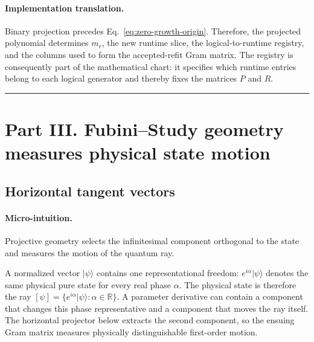 \documentclass[10pt,twocolumn]{article}
\newcommand{\ket}[1]{\lvert #1\rangle}
\newcommand{\R}{\mathbb R}
\newcommand{\conceptbreak}{%
  \par\medskip\noindent
  {\color{black!30}\rule{\columnwidth}{0.35pt}}%
  \par\medskip}
\newcommand{\micro}{\paragraph{Micro-intuition.}}
\newcommand{\impl}{\paragraph{Implementation translation.}}
\begin{document}
\impl Binary projection precedes Eq.~\eqref{eq:zero-growth-origin}. Therefore,
the projected polynomial determines \(m_r\), the new runtime slice, the
logical-to-runtime registry, and the columns used to form the accepted-refit
Gram matrix. The registry is consequently part of the mathematical chart: it
specifies which runtime entries belong to each logical generator and thereby
fixes the matrices \(P\) and \(R\).

\conceptbreak

\section*{Part III. Fubini--Study geometry measures physical state motion}

\subsection*{Horizontal tangent vectors}

\micro Projective geometry selects the infinitesimal component orthogonal to
the state and measures the motion of the quantum ray.

A normalized vector \(\ket\psi\) contains one representational freedom:
\(e^{i\alpha}\ket\psi\) denotes the same physical pure state for every real
phase \(\alpha\). The physical state is therefore the ray
\([\psi]=\{e^{i\alpha}\ket\psi:\alpha\in\R\}\). A parameter derivative can
contain a component that changes this phase representative and a component that
moves the ray itself. The horizontal projector below extracts the second
component, so the ensuing Gram matrix measures physically distinguishable
first-order motion.
\end{document}
